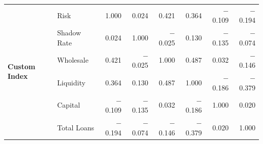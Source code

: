 \documentclass[12pt,a4paper]{report}\usepackage[a4paper, top=2.5cm, bottom=2.5cm, left=2.5cm, right=2.5cm]{geometry}
\begin{document}
\begin{table}[H]
{\begin{tabular}{ll rrrrrr}
\multirow{6}{*}{\textbf{Custom Index}}
 & Risk          &  1.000 &  0.024 &  0.421 &  0.364 & $-$0.109 & $-$0.194 \\
 & Shadow Rate   &  0.024 &  1.000 & $-$0.025 &  0.130 & $-$0.135 & $-$0.074 \\
 & Wholesale     &  0.421 & $-$0.025 &  1.000 &  0.487 &  0.032 & $-$0.146 \\
 & Liquidity     &  0.364 &  0.130 &  0.487 &  1.000 & $-$0.186 & $-$0.379 \\
 & Capital       & $-$0.109 & $-$0.135 &  0.032 & $-$0.186 &  1.000 &  0.020 \\
 & Total Loans   & $-$0.194 & $-$0.074 & $-$0.146 & $-$0.379 &  0.020 &  1.000 \\

\bottomrule
\end{tabular}%
}
\end{table}
\end{document}
